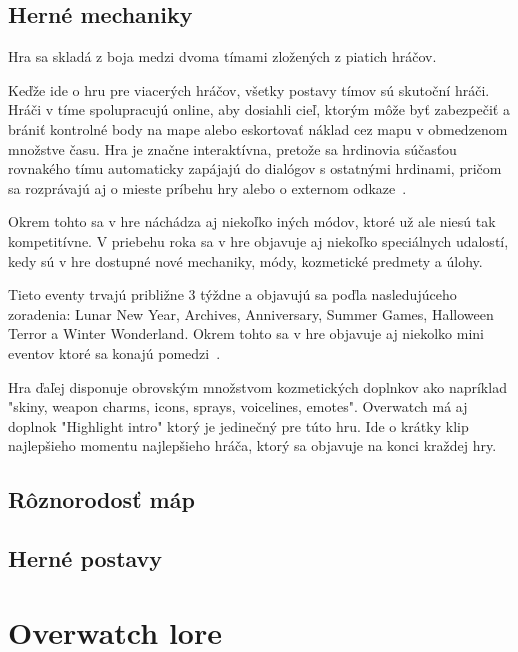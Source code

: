 \documentclass[10pt,oneside,slovak,a4paper]{article}
\begin{document}
\subsection{Herné mechaniky} \label{Herné mechaniky}


Hra sa skladá z boja medzi dvoma tímami zložených z piatich hráčov. 

Keďže ide o hru pre viacerých hráčov, všetky postavy tímov sú skutoční hráči. Hráči v tíme spolupracujú online, aby dosiahli cieľ, ktorým môže byť zabezpečiť a brániť kontrolné body na mape alebo eskortovať náklad cez mapu v obmedzenom množstve času. Hra je značne interaktívna, pretože sa hrdinovia súčasťou rovnakého tímu automaticky zapájajú do dialógov s ostatnými hrdinami, pričom sa rozprávajú aj o mieste príbehu hry alebo o externom odkaze~\cite{Overwatchbook}.

Okrem tohto sa v hre náchádza aj niekoľko iných módov, ktoré už ale niesú tak kompetitívne. V priebehu roka sa v hre objavuje aj niekoľko speciálnych udalostí,
 kedy sú v hre dostupné nové mechaniky, módy, kozmetické predmety a úlohy.

Tieto eventy trvajú približne 3 týždne a objavujú sa poďla nasledujúceho
zoradenia: Lunar New Year, Archives, Anniversary, Summer Games, Halloween Terror a Winter Wonderland. Okrem tohto sa v hre objavuje aj niekolko mini eventov ktoré sa konajú pomedzi~\cite{Overwatchbook}.



Hra ďaľej disponuje obrovským množstvom kozmetických doplnkov ako napríklad "skiny, weapon charms, icons, sprays, voicelines, emotes". Overwatch
má aj doplnok "Highlight intro" ktorý je jedinečný pre túto hru. Ide o krátky klip najlepšieho momentu najlepšieho hráča, ktorý sa objavuje na konci kraždej hry.




\subsection{Rôznorodosť máp} \label{Rôznorodosť máp}




\subsection{Herné postavy} \label{Herné postavy}


\section{Overwatch lore} \label{Overwatch lore}
\end{document}
